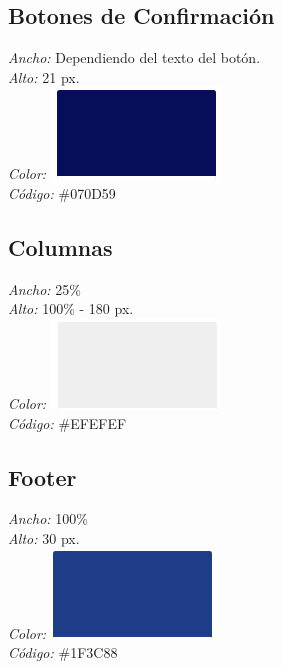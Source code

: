 \subsection{Botones de Confirmación}

\noindent \textit{Ancho:} Dependiendo del texto del botón.\\
\textit{Alto:} 21 px.\\
\textit{Color:} \includegraphics[scale=1]{imagenes/iconografia/ColorBoton.png}\\
\textit{Código:} \#070D59\\

\subsection{Columnas}

\noindent \textit{Ancho:} 25\%\\
\textit{Alto:} 100\% - 180 px.\\
\textit{Color:} \includegraphics[scale=1]{imagenes/iconografia/ColorColumnas.png}\\
\textit{Código:} \#EFEFEF\\

\subsection{Footer}

\noindent \textit{Ancho:} 100\%\\
\textit{Alto:} 30 px.\\
\textit{Color:} \includegraphics[scale=1]{imagenes/iconografia/ColorMenu.png}\\
\textit{Código:} \#1F3C88\\